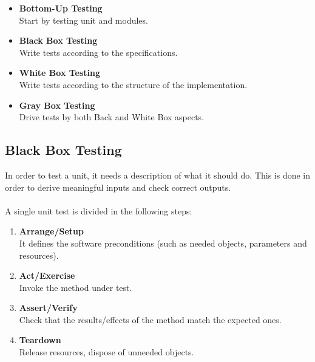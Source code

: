 \documentclass{article}
\begin{document}
\begin{itemize}
	\item \textbf{Bottom-Up Testing}
	\vspace{.2cm} \\
	Start by testing unit and modules.
	
	\item \textbf{Black Box Testing}
	\vspace{.2cm} \\
	Write tests according to the specifications.
	
	\item \textbf{White Box Testing}
	\vspace{.2cm} \\
	Write tests according to the structure of the implementation.
	
	\item \textbf{Gray Box Testing}
	\vspace{.2cm} \\
	Drive tests by both Back and White Box aspects.
\end{itemize}

\subsection{Black Box Testing}
In order to test a unit, it needs a description of what it should do. This is done in order to derive meaningful inputs and check correct outputs. \\ \\
A single unit test is divided in the following steps:

\begin{enumerate}
	\item \textbf{Arrange/Setup}
	\vspace{.2cm} \\
	It defines the software preconditions (such as needed objects, parameters and resources).
	
	\item \textbf{Act/Exercise}
	\vspace{.2cm} \\
	Invoke the method under test.
	
	\item \textbf{Assert/Verify}
	\vspace{.2cm} \\
	Check that the results/effects of the method match the expected ones.
	
	\item \textbf{Teardown}
	\vspace{.2cm} \\
	Release resources, dispose of unneeded objects.
\end{enumerate}
\end{document}
